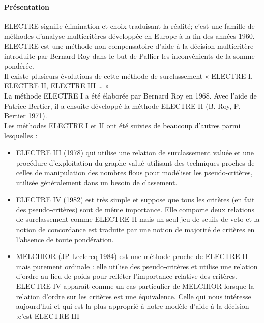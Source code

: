 \paragraph{Présentation}
ELECTRE signifie élimination et choix traduisant la réalité; c’est une famille de méthodes d'analyse multicritères développée en Europe à la fin des années 1960.\\
ELECTRE est une méthode non compensatoire d'aide à la décision multicritère introduite par Bernard Roy dans le but de Pallier les inconvénients de la somme pondérée.\\
Il existe plusieurs évolutions de cette méthode de surclassement « ELECTRE I, ELECTRE II, ELECTRE III … »\\
La méthode ELECTRE I a été élaborée par Bernard Roy en 1968. Avec l'aide de Patrice Bertier, il a ensuite développé la méthode ELECTRE II (B. Roy, P. Bertier 1971).\\
Les méthodes ELECTRE I et II ont été suivies de beaucoup d'autres parmi lesquelles :
\begin{itemize}
\item ELECTRE III (1978) qui utilise une relation de surclassement valuée et une procédure d'exploitation du graphe valué utilisant des techniques proches de celles de manipulation des nombres flous pour modéliser les pseudo-critères, utilisée généralement dans un besoin de classement.
\item ELECTRE IV (1982) est très simple et suppose que tous les critères (en fait des pseudo-critères) sont de même importance. Elle comporte deux relations de surclassement comme ELECTRE II mais un seul jeu de seuils de veto et la notion de concordance est traduite par une notion de majorité de critères en l'absence de toute pondération.
\item MELCHIOR (JP Leclercq 1984) est une méthode proche de ELECTRE II mais purement ordinale : elle utilise des pseudo-critères et utilise une relation d'ordre au lieu de poids pour refléter l'importance relative des critères. ELECTRE IV apparaît comme un cas particulier de MELCHIOR lorsque la relation d'ordre sur les critères est une équivalence.
Celle qui nous intéresse aujourd’hui et qui est la plus approprié à notre modèle d’aide à la décision :c’est ELECTRE III\\

\end{itemize}


